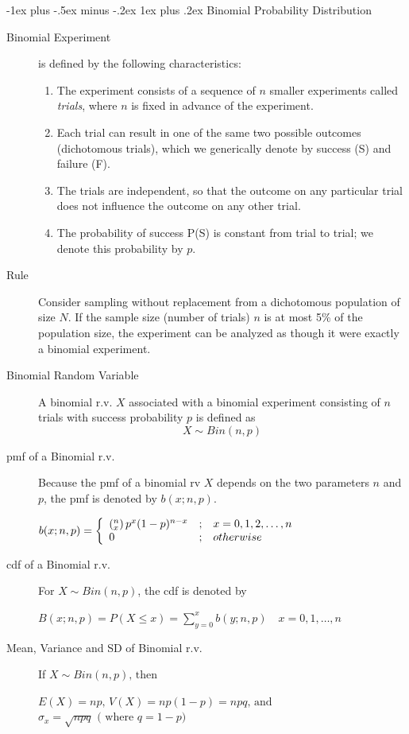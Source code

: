 \documentclass[10pt,landscape]{article}
\makeatletter
\renewcommand{\subsubsection}{\@startsection{subsubsection}{3}{0mm}%
                                {-1ex plus -.5ex minus -.2ex}%
                                {1ex plus .2ex}%
                                {\normalfont\small\bfseries}}
\makeatother
\begin{document}
\begin{multicols}{3}
\subsubsection{Binomial Probability Distribution}
\begin{description}
  \item[Binomial Experiment] is defined by the following characteristics:
  \begin{enumerate}
    \item The experiment consists of a sequence of $n$ smaller experiments called \emph{trials}, where $n$ is fixed in advance of the experiment.
    \item Each trial can result in one of the same two possible outcomes (dichotomous trials), which we generically denote by success (S) and failure (F).
    \item The trials are independent, so that the outcome on any particular trial does not influence the outcome on any other trial.
    \item The probability of success P(S) is constant from trial to trial; we denote this probability by $p$.
  \end{enumerate}
  \item[Rule] Consider sampling without replacement from a dichotomous population of size $N$. If the sample size (number of trials) $n$ is at most 5\% of the population size, the experiment can be analyzed as though it were exactly a binomial experiment.
  \item[Binomial Random Variable] A binomial r.v. $X$ associated with a binomial experiment consisting of $n$ trials with success probability $p$ is defined as
  \[X \sim Bin(n, p)\]
  \item[pmf of a Binomial r.v.] Because the pmf of a binomial rv $X$ depends on the two parameters $n$ and $p$, the pmf is denoted by $b(x; n, p)$.
    \begin{center}
       $b(x; n, p) = \left\{\begin{array}{{lcl}} \left(^n_x \right)p^x(1-p)^{n-x} &; & x= 0, 1, 2, \dots, n  \\ 0 &; & otherwise \end{array} \right.$
    \end{center}
  \item[cdf of a Binomial r.v.] For $X \sim Bin(n, p)$, the cdf is denoted by
    \begin{center}
      $B(x; n, p) = P(X \leq x) = \sum_{y=0}^x b( y; n, p) \quad x = 0, 1, \dots , n$
    \end{center}
  \item[Mean, Variance and SD of Binomial r.v.] If $X \sim Bin(n, p)\text{, then }$
    \begin{center}
      $E(X) = np\text{, }V(X)=np(1-p) = npq \text{, and }$ \\
      $\sigma_x =  \sqrt{npq}\text{ ( where }q = 1 - p)$
    \end{center}
\end{description}


\end{multicols}
\end{document}
